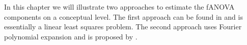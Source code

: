 In this chapter we will illustrate two approaches to estimate the fANOVA components on a conceptual level. The first approach can be found in \cite{hooker2007} and is essentially a linear least squares problem. The second approach uses Fourier polynomial expansion and is proposed by \cite{rahman2014}.